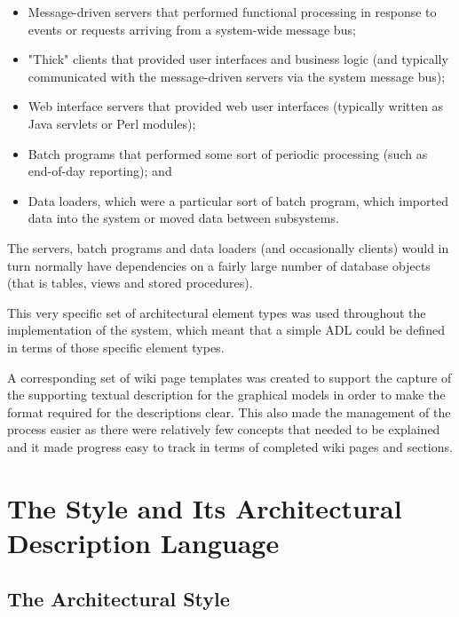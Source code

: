   \begin{itemize}

\item Message-driven servers that performed functional processing in response to events or requests arriving from a system-wide message bus;

\item "Thick" clients that provided user interfaces and business logic (and typically communicated with the message-driven servers via the system message bus);

\item Web interface servers that provided web user interfaces (typically written as Java servlets or Perl modules);

\item Batch programs that performed some sort of periodic processing (such as end-of-day reporting); and 

\item Data loaders, which were a particular sort of batch program, which imported data into the system or moved data between subsystems.

\end{itemize}

  The servers, batch programs and data loaders (and occasionally clients) would in turn normally have dependencies on a fairly large number of database objects (that is tables, views and stored procedures).

  This very specific set of architectural element types was used throughout the implementation of the system, which meant that a simple ADL could be defined in terms of those specific element types.

  A corresponding set of wiki page templates was created to support the capture of the supporting textual description for the graphical models in order to make the format required for the descriptions clear. This also made the management of the process easier as there were relatively few concepts that needed to be explained and it made progress easy to track in terms of completed wiki pages and sections.

\section{The Style and Its Architectural Description Language}

\subsection{The Architectural Style}

